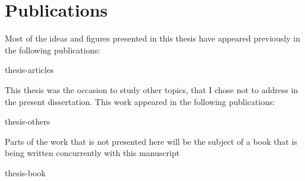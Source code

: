 

\chapter*{Publications} %

Most of the ideas and figures presented in this thesis have appeared previously in the following publications:

\smallskip


\begin{btSect}{thesis-articles}
\btPrintAll
\end{btSect}

\bigskip

This thesis was the occasion to study other topics, that I chose
not to address in the present dissertation. This work appeared in the following
publications:

\smallskip


\begin{btSect}{thesis-others}
\btPrintAll
\end{btSect}

\bigskip

Parts of the work that is not presented here will be the subject of a book that
is being written concurrently with this manuscript

\smallskip


\begin{btSect}{thesis-book}
\btPrintAll
\end{btSect}
